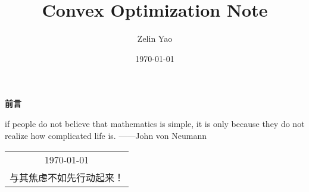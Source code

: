 \title{{\Huge{\textbf{Convex Optimization Note}}}}
\author{Zelin Yao}
\date{\today}
\maketitle                   %

\thispagestyle{empty}        %
\begin{center}
	\Huge\textbf{前言}
\end{center}

if people do not believe that mathematics is simple, 
it is only because they do not realize how complicated life is. ——John von Neumann

\begin{flushright}
	\begin{tabular}{c}
		\today \\ 与其焦虑不如先行动起来！
	\end{tabular}
\end{flushright}

\newpage                      %
\pagestyle{plain}             %
\setcounter{page}{1}          %
\tableofcontents              %

\newpage                      %
\pagestyle{plain}
\setcounter{page}{1}          %
